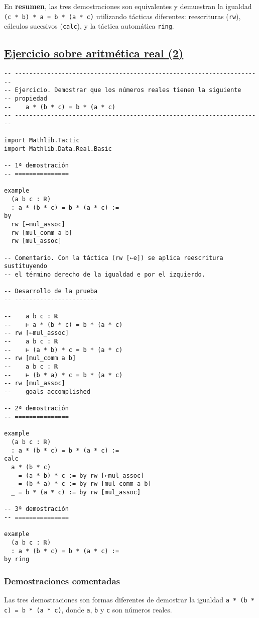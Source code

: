 En \textbf{resumen}, las tres demostraciones son equivalentes y demuestran la
igualdad \texttt{(c * b) * a = b * (a * c)} utilizando tácticas diferentes:
reescrituras (\texttt{rw}), cálculos sucesivos (\texttt{calc}), y la táctica automática
\texttt{ring}.

\subsection{\href{./src/Basicos/Ejercicio\_sobre\_aritmetica\_real\_2.lean}{Ejercicio sobre aritmética real (2)}}
\label{sec:org91b8c33}
\begin{verbatim}
-- ---------------------------------------------------------------------
-- Ejercicio. Demostrar que los números reales tienen la siguiente
-- propiedad
--    a * (b * c) = b * (a * c)
-- ---------------------------------------------------------------------

import Mathlib.Tactic
import Mathlib.Data.Real.Basic

-- 1ª demostración
-- ===============

example
  (a b c : ℝ)
  : a * (b * c) = b * (a * c) :=
by
  rw [←mul_assoc]
  rw [mul_comm a b]
  rw [mul_assoc]

-- Comentario. Con la táctica (rw [←e]) se aplica reescritura sustituyendo
-- el término derecho de la igualdad e por el izquierdo.

-- Desarrollo de la prueba
-- -----------------------

--    a b c : ℝ
--    ⊢ a * (b * c) = b * (a * c)
-- rw [←mul_assoc]
--    a b c : ℝ
--    ⊢ (a * b) * c = b * (a * c)
-- rw [mul_comm a b]
--    a b c : ℝ
--    ⊢ (b * a) * c = b * (a * c)
-- rw [mul_assoc]
--    goals accomplished

-- 2ª demostración
-- ===============

example
  (a b c : ℝ)
  : a * (b * c) = b * (a * c) :=
calc
  a * (b * c)
    = (a * b) * c := by rw [←mul_assoc]
  _ = (b * a) * c := by rw [mul_comm a b]
  _ = b * (a * c) := by rw [mul_assoc]

-- 3ª demostración
-- ===============

example
  (a b c : ℝ)
  : a * (b * c) = b * (a * c) :=
by ring
\end{verbatim}
\subsubsection*{Demostraciones comentadas}

Las tres demostraciones son formas diferentes de demostrar la igualdad
\texttt{a * (b * c) = b * (a * c)}, donde \texttt{a}, \texttt{b} y \texttt{c} son números reales.

